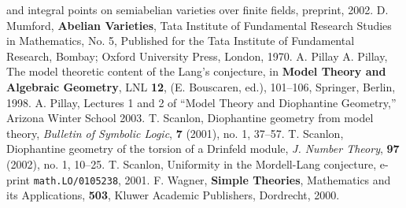 \documentclass{amsart}
\theoremstyle{definition}
\theoremstyle{remark}
\begin{document}
\begin{thebibliography}{99}
and integral points on semiabelian varieties over finite fields, preprint, 2002. 
 {\sc D. Mumford}, {\bf Abelian Varieties},  
Tata Institute of Fundamental Research Studies in Mathematics, No. 5,
Published for the Tata Institute of Fundamental Research, Bombay; Oxford University Press, London, 1970.
 {\sc A. Pillay} {\sc A. Pillay}, The model theoretic content of the Lang's conjecture, in 
	{\bf Model Theory and Algebraic Geometry}, LNL {\bf 12}, (E. Bouscaren, ed.), 101--106, Springer,
	Berlin, 1998.
 {\sc A. Pillay}, Lectures 1 and 2 of ``Model Theory and Diophantine Geometry,'' Arizona
Winter School 2003.
 {\sc T. Scanlon}, Diophantine geometry from model theory, \emph{Bulletin of Symbolic Logic}, 
{\bf 7} (2001), no. 1, 37--57. 
 {\sc T. Scanlon}, Diophantine geometry of the torsion of a Drinfeld
module, \emph{J. Number Theory}, {\bf 97} (2002), no. 1, 10--25.
 {\sc T. Scanlon}, Uniformity in the Mordell-Lang conjecture, e-print {\tt math.LO/0105238}, 2001. 
 {\sc F. Wagner}, {\bf Simple Theories}, Mathematics and its Applications, 
{\bf 503}, Kluwer Academic Publishers, Dordrecht, 2000.

\end{thebibliography}
\end{document}
